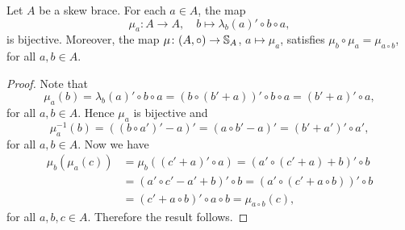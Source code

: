 \begin{proposition}
\label{pro:mu}
    Let $A$ be a skew brace. For each $a\in A$, the map
    \[
        \mu_a\colon A\to A,\quad
        b\mapsto \lambda_b(a)'\circ b\circ a,
    \]
    is bijective. Moreover, the map 
    $\mu\colon (A,\circ)\to\mathbb{S}_A$, $a\mapsto\mu_a$, satisfies $\mu_b\circ\mu_a=\mu_{a\circ b}$, for all $a,b\in A$. 
\end{proposition}

\begin{proof}
    Note that
    \[\mu_a(b)=\lambda_b(a)'\circ b\circ a=(b\circ (b'+a))'\circ b\circ a=(b'+a)'\circ a,\]
    for all $a,b\in A$. Hence $\mu_a$ is bijective and
    \[\mu_a^{-1}(b)=((b\circ a')'-a)'=(a\circ b'-a)'=(b'+a')'\circ a',\]
    for all $a,b\in A$. Now we have
    \begin{align*}
        \mu_b(\mu_a(c))&=\mu_b((c'+a)'\circ a)=(a'\circ (c'+a)+b)'\circ b\\
        &=(a'\circ c'-a'+b)'\circ b=(a'\circ (c'+a\circ b))'\circ b\\
        &=(c'+a\circ b)'\circ a\circ b=\mu_{a\circ b}(c),
    \end{align*}
    for all $a,b,c\in A$. Therefore the result follows.
%    
\end{proof}


